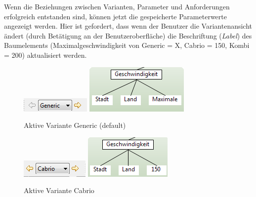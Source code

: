 
Wenn die Beziehungen zwischen Varianten, Parameter und Anforderungen erfolgreich entstanden sind, können jetzt die gespeicherte Parameterwerte angezeigt werden. Hier ist gefordert, dass wenn der Benutzer die Variantenansicht ändert (durch Betätigung an der Benutzeroberfläche) die Beschriftung (\textit{Label}) des Baumelements (Maximalgeschwindigkeit von Generic = X, Cabrio = 150, Kombi = 200) aktualisiert werden.\\



\begin{figure}[h!]
  \begin{center}
    \includegraphics{4_2_Change_Var_Generic.png}
    \includegraphics[scale=0.8]{4_2_Change_Var_Generic_Tree.png}
  		  \caption{Aktive Variante Generic (default)}
     \label{ttn.generic}
  \end{center}
\end{figure}

\begin{figure}[h!]
  \begin{center}
    \includegraphics{4_2_Change_Var_Cabrio.png}
    \includegraphics[scale=0.9]{4_2_Change_Var_Cabrio_Tree.png}
  		  \caption{Aktive Variante Cabrio}
     \label{ttn.2}
  \end{center}
\end{figure}

